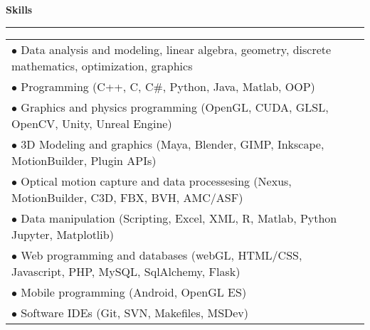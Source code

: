 \needspace{6em}
{\large {\bf Skills}}
\vspace{0.1cm}
\hrule
\begin{tabular*}{7.1in}{@{}l@{\extracolsep\fill}r}
\noindent
$\bullet$ Data analysis and modeling, linear algebra, geometry, discrete mathematics, optimization, graphics\\
$\bullet$ Programming (C++, C, C\#, Python, Java, Matlab, OOP)\\
$\bullet$ Graphics and physics programming (OpenGL, CUDA, GLSL, OpenCV, Unity, Unreal Engine)\\
$\bullet$ 3D Modeling and graphics (Maya, Blender, GIMP, Inkscape, MotionBuilder, Plugin APIs)\\
$\bullet$ Optical motion capture and data processesing (Nexus, MotionBuilder, C3D, FBX, BVH, AMC/ASF)\\
$\bullet$ Data manipulation (Scripting, Excel, XML, R, Matlab, Python Jupyter, Matplotlib)\\
$\bullet$ Web programming and databases (webGL, HTML/CSS, Javascript, PHP, MySQL, SqlAlchemy, Flask)\\
$\bullet$ Mobile programming (Android, OpenGL ES)\\
$\bullet$ Software IDEs (Git, SVN, Makefiles, MSDev)\\
\end{tabular*}

